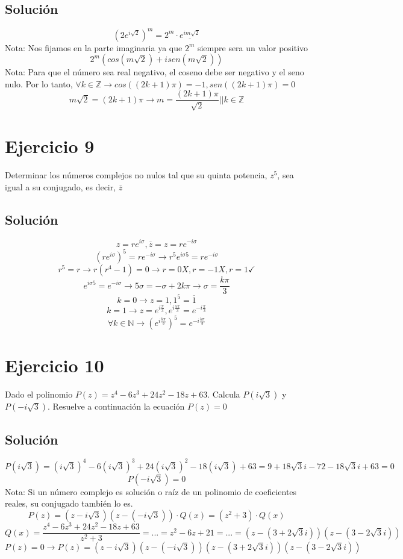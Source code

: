 \documentclass[fleqn]{article}
\begin{document}
	\subsection{Solución}
	\[
	(2e^{i\sqrt{2}})^{m} = 2^{m} \cdot \underline{e^{im\sqrt{2}}}
	\]
	Nota: Nos fijamos en la parte imaginaria ya que $2^{m}$ siempre sera un valor positivo
	\[
	2^{m}(cos(m\sqrt{2}) + isen(m\sqrt{2}))
	\]
	Nota: Para que el número sea real negativo, el coseno debe ser negativo y el seno nulo. Por lo tanto, $\forall k \in \mathbb{Z} \rightarrow cos((2k+1)\pi) = -1, sen((2k+1)\pi) = 0$
	\[
	m\sqrt{2} = (2k+1)\pi \rightarrow \boxed{m = \frac{(2k+1)\pi}{\sqrt{2}} || k \in \mathbb{Z}}
	\]
	\section{Ejercicio 9}
	Determinar los números complejos no nulos tal que su quinta potencia, $z^{5}$, sea igual a su conjugado, es decir, $\overline{z}$
	\subsection{Solución}
	\[
	z = re^{i\sigma}, \overline{z} = z = re^{-i\sigma}
	\]
	\[
	(re^{i\sigma})^{5} = re^{-i\sigma} \rightarrow r^{5}e^{i\sigma5} = re^{-i\sigma}
	\]
	\[
	r^{5} = r \rightarrow r(r^{4} - 1) = 0 \rightarrow r = 0 X, r = -1 X, r = 1 \checkmark
	\]
	\[
	e^{i\sigma5} = e^{-i\sigma} \rightarrow 5\sigma = -\sigma + 2k\pi \rightarrow \sigma = \frac{k\pi}{3}
	\]
	\[
	k = 0 \rightarrow z = 1, \boxed{1^{5} = \overline{1}}
	\]
	\[
	k = 1 \rightarrow z = e^{i\frac{\pi}{3}}, \boxed{e^{i\frac{5\pi}{3}} = e^{-i\frac{\pi}{3}}}
	\]
	\[
	\boxed{\forall k \in \mathbb{N} \rightarrow (e^{i\frac{k\pi}{3}})^{5} = e^{-i\frac{k\pi}{3}}}
	\]
	\section{Ejercicio 10}
	Dado el polinomio $P(z) = z^{4} -6z^{3} + 24z^{2} -18z + 63$. Calcula $P(i\sqrt{3})$ y $P(-i\sqrt{3})$. Resuelve a continuación la ecuación $P(z) = 0$
	\subsection{Solución}
	\[
	P(i\sqrt{3}) = (i\sqrt{3})^{4} - 6(i\sqrt{3})^{3} + 24 (i\sqrt{3})^{2} - 18(i\sqrt{3}) + 63 = 9 + 18\sqrt{3}i - 72 - 18\sqrt{3}i + 63 = \boxed{0}
	\]
	\[
	\boxed{P(-i\sqrt{3}) = 0} 
	\]
	Nota: Si un número complejo es solución o raíz de un polinomio de coeficientes reales, su conjugado también lo es. \\
	\[
	P(z) = (z - i\sqrt{3})(z - (-i\sqrt{3})) \cdot Q(x) = (z^{2} + 3) \cdot Q(x) 
 	\]
 	\[
 	Q(x) = \frac{z^{4} -6z^{3} + 24z^{2} -18z + 63}{z^{2} + 3} = \text{...} = z^{2} - 6z + 21 = \text{...} = (z - (3+2\sqrt{3}i))(z - (3-2\sqrt{3}i))
 	\]
 	\[
 	P(z) = 0 \rightarrow \boxed{P(z) = (z - i\sqrt{3})(z - (-i\sqrt{3}))(z - (3+2\sqrt{3}i))(z - (3-2\sqrt{3}i))}
 	\]
\end{document}
